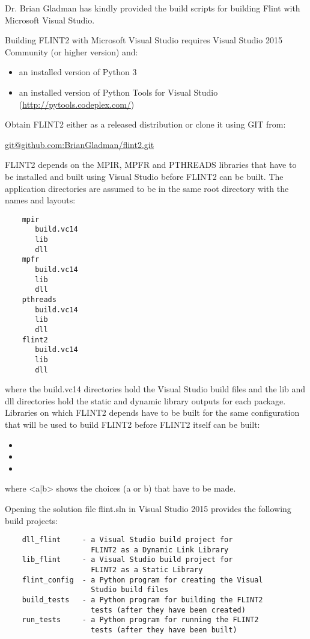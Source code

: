 \documentclass[a4paper,10pt]{book}
\begin{document}
Dr. Brian Gladman has kindly provided the build scripts for building
Flint with Microsoft Visual Studio.

Building FLINT2 with Microsoft Visual Studio requires 
Visual Studio 2015 Community (or higher version) and:
\begin{itemize}
\item an installed version of Python 3
\item an installed version of Python Tools 
         for Visual Studio (\url{http://pytools.codeplex.com/})
\end{itemize}

Obtain FLINT2 either as a released distribution or clone it using
GIT from:

\indent \url{git@github.com:BrianGladman/flint2.git}

FLINT2 depends on the MPIR, MPFR and PTHREADS libraries that have
to be installed and built using Visual Studio before FLINT2 can
be built.  The application directories are assumed to be in the
same root directory with the names and layouts:
   
\begin{verbatim}
    mpir
       build.vc14
       lib
       dll
    mpfr  
       build.vc14
       lib
       dll
    pthreads  
       build.vc14
       lib
       dll
    flint2
       build.vc14
       lib
       dll
\end{verbatim}
   
where the build.vc14 directories hold the Visual Studio build
files and the lib and dll directories hold the static and dynamic
library outputs for each package.  Libraries on which FLINT2
depends have to be built for the same configuration that will be 
used to build FLINT2 before FLINT2 itself can be built:
\begin{itemize}
\item <Static Library|Dynamic Link Library>
\item <Win32|x64>
\item <Release|Debug>
\end{itemize}
where <a|b> shows the choices (a or b) that have to be made.   

Opening the solution file flint.sln in Visual Studio 2015 provides
the following build projects:

\begin{verbatim}
    dll_flint     - a Visual Studio build project for
                    FLINT2 as a Dynamic Link Library
    lib_flint     - a Visual Studio build project for
                    FLINT2 as a Static Library
    flint_config  - a Python program for creating the Visual 
                    Studio build files
    build_tests   - a Python program for building the FLINT2
                    tests (after they have been created)
    run_tests     - a Python program for running the FLINT2
                    tests (after they have been built)
\end{verbatim}
\end{document}
